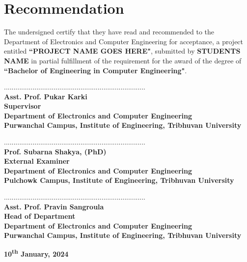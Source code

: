 \chapter*{Recommendation}
The undersigned certify that they have read and recommended to the Department of
Electronics and Computer Engineering for acceptance, a project entitled \textbf{``PROJECT NAME GOES HERE"}, submitted by \textbf{STUDENTS NAME} in partial fulfillment of the requirement for the award of the degree of \textbf{``Bachelor of Engineering in Computer Engineering"}.\par
        \vspace{1cm}
..........................................................................\\
\textbf{Asst. Prof. Pukar Karki\\
Supervisor\\
Department of Electronics and Computer Engineering\\
Purwanchal Campus, Institute of Engineering, Tribhuvan University}\par
        \vspace{1cm}
..........................................................................\\
\textbf{Prof. Subarna Shakya, (PhD)\\
External Examiner \\
Department of Electronics and Computer Engineering\\
Pulchowk Campus, Institute of Engineering, Tribhuvan University}\par
        \vspace{1cm}
..........................................................................\\
\textbf{
Asst. Prof. Pravin Sangroula\\ 
Head of Department \\
Department of Electronics and Computer Engineering\\Purwanchal Campus, Institute of Engineering, Tribhuvan University}\par
\vspace{2.5cm}

\begin{center}
\textbf{10\textsuperscript{th} January, 2024}
\end{center}
\newpage


